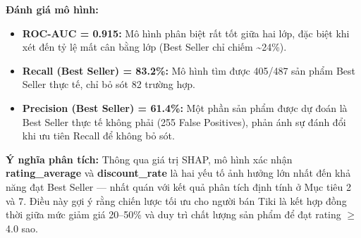 \textbf{Đánh giá mô hình:}
\begin{itemize}
    \item \textbf{ROC-AUC = 0.915:} Mô hình phân biệt rất tốt giữa hai lớp, đặc biệt khi xét đến tỷ lệ mất cân bằng lớp (Best Seller chỉ chiếm \~{}24\%).
    \item \textbf{Recall (Best Seller) = 83.2\%:} Mô hình tìm được 405/487 sản phẩm Best Seller thực tế, chỉ bỏ sót 82 trường hợp.
    \item \textbf{Precision (Best Seller) = 61.4\%:} Một phần sản phẩm được dự đoán là Best Seller thực tế không phải (255 False Positives), phản ánh sự đánh đổi khi ưu tiên Recall để không bỏ sót.
\end{itemize}

\textbf{Ý nghĩa phân tích:} Thông qua giá trị SHAP, mô hình xác nhận \textbf{rating\_average} và \textbf{discount\_rate} là hai yếu tố ảnh hưởng lớn nhất đến khả năng đạt Best Seller — nhất quán với kết quả phân tích định tính ở Mục tiêu 2 và 7. Điều này gợi ý rằng chiến lược tối ưu cho người bán Tiki là kết hợp đồng thời giữa mức giảm giá 20–50\% và duy trì chất lượng sản phẩm để đạt rating $\geq$ 4.0 sao.

\clearpage
